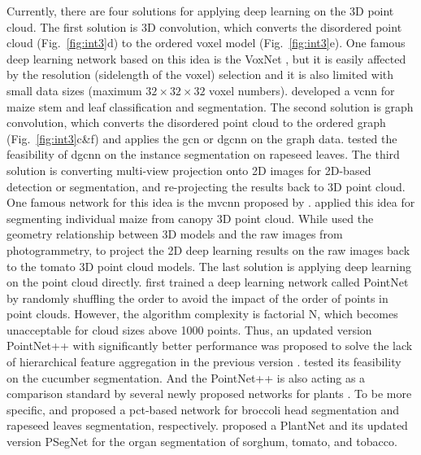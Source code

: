 

Currently, there are four solutions for applying deep learning on the 3D point cloud. 
The first solution is 3D convolution, which converts the disordered point cloud (Fig.~\ref{fig:int3}d) to the ordered voxel model (Fig.~\ref{fig:int3}e). One famous deep learning network based on this idea is the VoxNet \citep{Maturana_VoxNet_2015}, but it is easily affected by the resolution (sidelength of the voxel) selection and it is also limited with small data sizes (maximum $32 \times 32 \times 32$ voxel numbers). \citet{jin_separating_2020} developed a \gls{vcnn} for maize stem and leaf classification and segmentation. 
The second solution is graph convolution, which converts the disordered point cloud to the ordered graph (Fig.~\ref{fig:int3}c\&f) and applies the \gls{gcn} \citep{wu_comprehensive_2021,zhou_graph_2020} or \gls{dgcnn} \citep{phan_dgcnn_2018} on the graph data. \citet{du_pst_2023} tested the feasibility of \gls{dgcnn} on the instance segmentation on rapeseed leaves.
The third solution is converting multi-view projection onto 2D images for 2D-based detection or segmentation, and re-projecting the results back to 3D point cloud. One famous network for this idea is the \gls{mvcnn} proposed by \citet{su_mvcnn_2015}. \citet{jin_deep_2018} applied this idea for segmenting individual maize from canopy 3D point cloud. While \citet{van_plant_2019} used the geometry relationship between 3D models and the raw images from photogrammetry, to project the 2D deep learning results on the raw images back to the tomato 3D point cloud models.
The last solution is applying deep learning on the point cloud directly. \citet{qi_pointnet_2016} first trained a deep learning network called PointNet by randomly shuffling the order to avoid the impact of the order of points in point clouds. However, the algorithm complexity is factorial N, which becomes unacceptable for cloud sizes above 1000 points. Thus, an updated version PointNet++ with significantly better performance was proposed to solve the lack of hierarchical feature aggregation in the previous version \citep{qi_pointnet_2017}. \citet{boogaard_boosting_2021} tested its feasibility on the cucumber segmentation. And the PointNet++ is also acting as a comparison standard by several newly proposed networks for plants \citep{jin_separating_2020,zhou_automated_2022,du_pst_2023,li_psegnet_2022}. To be more specific, \citet{zhou_automated_2022} and \citet{du_pst_2023} proposed a \gls{pct}-based network for broccoli head segmentation and rapeseed leaves segmentation, respectively. \citet{li_plantnet_2022} proposed a PlantNet and its updated version PSegNet \citep{li_psegnet_2022} for the organ segmentation of sorghum, tomato, and tobacco.

